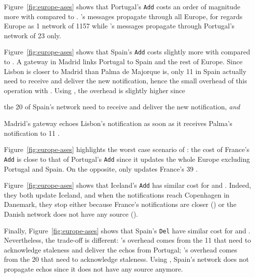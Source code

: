 \begin{asparadesc}
    \noindent Figure~\ref{fig:europe-ases} shows that Portugal's
    \texttt{Add} costs an order of magnitude more with \NAME compared
    to \NAMEC.  \NAME's messages propagate through all Europe, for
    \NAME regards Europe as 1 network of 1157 \processes while
    \NAMEC's messages propagate through Portugal's network of 23
    \processes only.

    \noindent Figure~\ref{fig:europe-ases} shows that Spain's
    \texttt{Add} costs slightly more with \NAMEC compared to \NAME.  A
    gateway in Madrid links Portugal to Spain and the rest of
    Europe. Since Lisbon is closer to Madrid than Palma de Majorque
    is, only 11 \processes in Spain actually need to receive and
    deliver the new notification, hence the small overhead of this
    operation with \NAME. Using \NAMEC, the overhead is slightly
    higher since
    \begin{inparaenum}[(i)]
    \item the 20 \processes of Spain's network need to receive and
      deliver the new notification, \emph{and}
    \item Madrid's gateway echoes Lisbon's notification as soon as it
      receives Palma's notification to 11 \processes.
    \end{inparaenum}

    \noindent Figure~\ref{fig:europe-ases} highlights the worst
    case scenario of \NAME: the cost of France's \texttt{Add} is close
    to that of Portugal's \texttt{Add} since it updates the whole
    Europe excluding Portugal and Spain. On the opposite, \NAMEC only
    updates France's 39 \processes.

    \noindent Figure~\ref{fig:europe-ases} shows that Iceland's
    \texttt{Add} has similar cost for \NAME and \NAMEC. Indeed, they
    both update Iceland, and when the notifications reach Copenhagen
    in Danemark, they stop either because France's notifications are
    closer (\NAME) or the Danish network does not have any source
    (\NAMEC).

    \noindent Finally, Figure~\ref{fig:europe-ases} shows that
    Spain's \texttt{Del} have similar cost for \NAME and
    \NAMEC. Nevertheless, the trade-off is different: \NAME's overhead
    comes from the 11 \nodes that need to acknowledge staleness and
    deliver the echos from Portugal; \NAMEC's overhead comes from the
    20 \nodes that need to acknowledge staleness. Using \NAMEC,
    Spain's network does not propagate echos since it does not have
    any source anymore.

\end{asparadesc}

